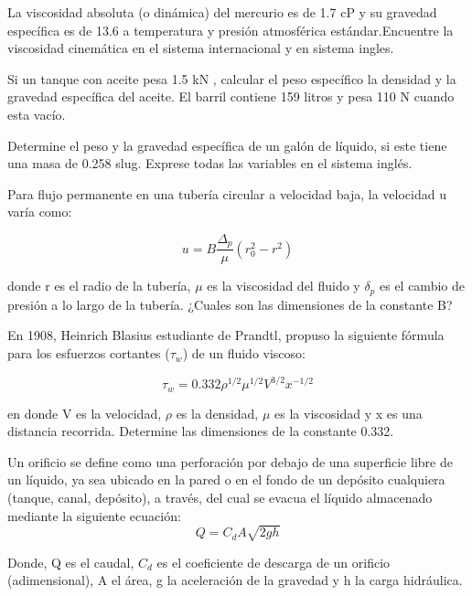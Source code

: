 \documentclass[12pt, a4paper]{exam}
\begin{document}
\begin{questions}
    \question La viscosidad absoluta (o dinámica) del mercurio es de 1.7 cP y su gravedad específica es de 13.6 a temperatura y presión atmosférica estándar.Encuentre la viscosidad cinemática en el sistema internacional y en sistema ingles.
    
    \question Si un tanque con aceite pesa 1.5 kN , calcular el peso específico la densidad y la gravedad específica del aceite. El barril contiene 159 litros y pesa 110 N cuando esta vacío. 
    
    \question Determine el peso y la gravedad específica de un galón de líquido, si este tiene una masa de 0.258 slug. Exprese todas las variables en el sistema inglés.
    
    \question Para flujo permanente en una tubería circular a velocidad baja, la velocidad u varía como:
    
    \begin{equation}
    u=B\frac{\Delta_{p}}{\mu }(r_{0}^{2}-r^{2})   
    \end{equation}
    
    donde r es el radio de la tubería, $\mu$ es la viscosidad del fluido y $\delta_p$ es el cambio de presión a lo largo de la tubería. ¿Cuales son las dimensiones de la constante B?

    \question En 1908, Heinrich Blasius estudiante de Prandtl, propuso la siguiente fórmula para los esfuerzos cortantes ($\tau_w$) de un fluido viscoso:
    
    \begin{equation}
    \tau_w=0.332\rho ^{1/2}\mu ^{1/2}V^{3/2}x^{-1/2}   
    \end{equation}
    
    en donde V es la velocidad, $\rho$ es la densidad, $\mu$ es la viscosidad y x es una distancia recorrida. Determine las dimensiones de la constante 0.332.
    
	\question Un orificio se define como una perforación por debajo de una superficie libre de un líquido, ya sea ubicado en la pared o en el fondo de un depósito cualquiera (tanque, canal, depósito), a través, del cual se evacua el líquido almacenado mediante la siguiente ecuación:
	\begin{equation}
    Q=C_{d}A\sqrt{2gh}
    \end{equation}
    
	Donde, Q es el caudal, $C_d$ es el coeficiente de descarga de un orificio (adimensional), A el área, g la aceleración de la gravedad y h la carga hidráulica.
	

\end{questions}
\end{document}
